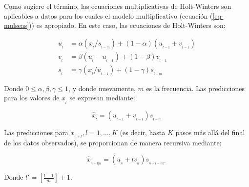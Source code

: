 \documentclass[
  us-letterpaper,
]{scrreprt}
\theoremstyle{plain}
\theoremstyle{definition}
\theoremstyle{definition}
\theoremstyle{plain}
\theoremstyle{remark}
\begin{document}
Como sugiere el término, las ecuaciones multiplicativas de Holt-Winters
son aplicables a datos para los cuales el modelo multiplicativo
(ecuación (\ref{eq-mulseas})) es apropiado. En este caso, las ecuaciones
de Holt-Winters son:

\[
\begin{split}
u_{_t}&= \alpha(x_{_t}/s_{_{t-m}})+(1-\alpha)(u_{_{t-1}}+v_{_{t-1}})\\
v_{_t}&= \beta(u_{_t}-u_{_{t-1}})+(1-\beta)v_{_{t-1}}\\
s_{_t}&= \gamma(x_{_t}/u_{_{t-1}})+(1-\gamma)s_{_{t-m}}
\end{split}
\]

Donde \(0 \le \alpha, \beta, \gamma \le 1\), y donde nuevamente, \(m\)
es la frecuencia. Las predicciones para los valores de \(x_{_t}\) se
expresan mediante:

\[ \hat{x}_{_t}= (u_{_{t-1}}+v_{_{t-1}})s_{_{t-m}} \]

Las predicciones para \(x_{_{n+l}}, l=1,\ldots,K\) (es decir, hasta
\(K\) pasos más allá del final de los datos observados), se proporcionan
de manera recursiva mediante:

\[
\hat{x}_{_{n+l|n}}=(u_{_n}+lv_{_n})s_{_{n+l-ml'.}}
\]

Donde \(l' =\left[ \frac{l-1}{m} \right] + 1\).
\end{document}
